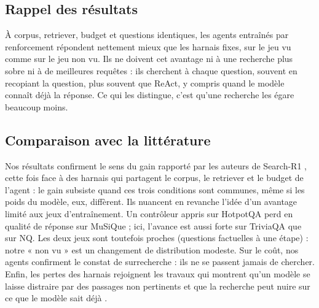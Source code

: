 \documentclass[11pt,a4paper]{article}
\newif\iffictif
\newcommand{\fictifnote}[1]{\iffictif\par\noindent\fcolorbox{red}{red!4}{\parbox{\dimexpr\linewidth-2\fboxsep-2\fboxrule}{\small\textcolor{red!70!black}{\textbf{Données fictives.} #1}}}\par\medskip\fi}
\begin{document}
\fictifnote{Cette discussion commente des résultats fictifs.}

\subsection{Rappel des résultats}
À corpus, retriever, budget et questions identiques, les agents entraînés par renforcement répondent nettement mieux que les harnais fixes, sur le jeu vu comme sur le jeu non vu. Ils ne doivent cet avantage ni à une recherche plus sobre ni à de meilleures requêtes : ils cherchent à chaque question, souvent en recopiant la question, plus souvent que ReAct, y compris quand le modèle connaît déjà la réponse. Ce qui les distingue, c'est qu'une recherche les égare beaucoup moins.

\subsection{Comparaison avec la littérature}
Nos résultats confirment le sens du gain rapporté par les auteurs de Search-R1 \citep{jin2025search}, cette fois face à des harnais qui partagent le corpus, le retriever et le budget de l'agent : le gain subsiste quand ces trois conditions sont communes, même si les poids du modèle, eux, diffèrent. Ils nuancent en revanche l'idée d'un avantage limité aux jeux d'entraînement. Un contrôleur appris sur HotpotQA perd en qualité de réponse sur MuSiQue \citep{raikote2026policy} ; ici, l'avance est aussi forte sur TriviaQA que sur NQ. Les deux jeux sont toutefois proches (questions factuelles à une étape) : notre « non vu » est un changement de distribution modeste. Sur le coût, nos agents confirment le constat de surrecherche \citep{wu2025search,tang2026saas} : ils ne se passent jamais de chercher. Enfin, les pertes des harnais rejoignent les travaux qui montrent qu'un modèle se laisse distraire par des passages non pertinents \citep{yoran2023making} et que la recherche peut nuire sur ce que le modèle sait déjà \citep{mallen2022when,maekawa2024retrieval}.
\end{document}
